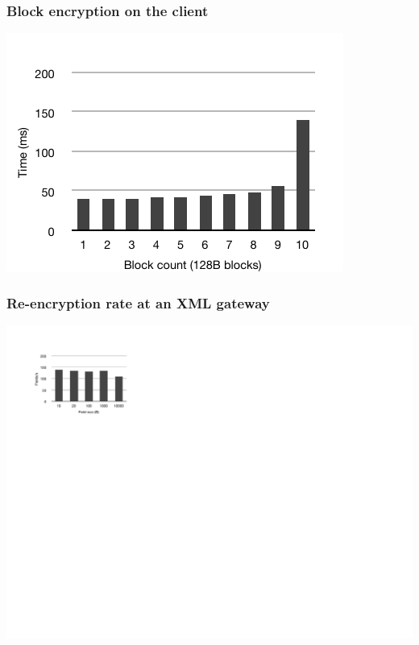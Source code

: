 \documentclass{beamer}
\begin{document}
\begin{frame}
\frametitle{Block encryption on the client}
\begin{center}
\includegraphics{client_field_count_new} \\
\end{center}
\end{frame}

\begin{frame}
\frametitle{Re-encryption rate at an XML gateway}
\begin{center}
\includegraphics{server_encrypt} \\
\end{center}
\end{frame}
\end{document}
